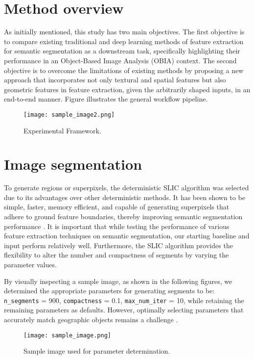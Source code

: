 \section{Method overview}
As initially mentioned, this study has two main objectives. The first objective is to compare existing traditional and deep learning methods of feature extraction for semantic segmentation as a downstream task, specifically highlighting their performance in an Object-Based Image Analysis (OBIA) context. The second objective is to overcome the limitations of existing methods by proposing a new approach that incorporates not only textural and spatial features but also geometric features in feature extraction, given the arbitrarily shaped inputs, in an end-to-end manner. Figure illustrates the general workflow pipeline.
\begin{figure}[h]
    \centering
    \texttt{[image: sample\_image2.png]}
     \caption{Experimental Framework.}

    \label{fig:sample_label}
\end{figure}



\section{Image segmentation}
To generate regions or superpixels, the deterministic SLIC algorithm was selected due to its advantages over other deterministic methods. It has been shown to be simple, faster, memory efficient, and capable of generating superpixels that adhere to ground feature boundaries, thereby improving semantic segmentation performance \cite{achanta_slic_2012}. It is important that while testing the performance of various feature extraction techniques on semantic segmentation, our starting baseline and input perform relatively well. Furthermore, the SLIC algorithm provides the flexibility to alter the number and compactness of segments by varying the parameter values.
%

By visually inspecting a sample image, as shown in the following figures, we determined the appropriate parameters for generating segments to be: \texttt{n\_segments} = 900, \texttt{compactness} = 0.1, \texttt{max\_num\_iter} = 10, while retaining the remaining parameters as defaults. However, optimally selecting parameters that accurately match geographic objects remains a challenge \cite{hossain_segmentation_2019}.

%

\begin{figure}[h]
    \centering
    \texttt{[image: sample\_image.png]}
    \caption{Sample image used for parameter determination.}
    \label{fig:sample_image}
\end{figure}

